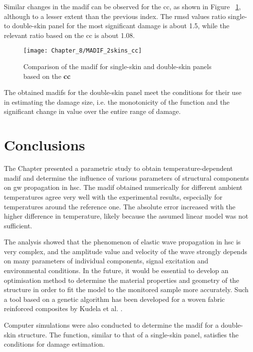 \documentclass[11pt,a4paper,final]{report}
\theoremstyle{plain}
\begin{document}
Similar changes in the \ac{madif} can be observed for the \ac{cc}, as shown in Figure ~\ref{fig:madif_2skins_cc}, although to a lesser extent than the previous index. 
The \ac{rmsd} values ratio single- to double-skin panel for the most significant damage is about 1.5, while the relevant ratio based on the \ac{cc} is about 1.08.
\begin{figure}[!htb]
	\begin{center}
		\texttt{[image: Chapter\_8/MADIF\_2skins\_cc]}
	\end{center}
	\caption{Comparison of the \acl{madif} for single-skin and double-skin panels based on the \textbf{\acf{cc}}}
	\label{fig:madif_2skins_cc}
\end{figure}

The obtained \acp{madif} for the double-skin panel meet the conditions for their use in estimating the damage size, i.e. the monotonicity of the function and the significant change in value over the entire range of damage.
 \section{Conclusions}
\label{sec:conclusionsTemp}
The Chapter presented a parametric study to obtain temperature-dependent \ac{madif} and determine the influence of various parameters of structural components on \ac{gw} propagation in \ac{hsc}. The \ac{madif} obtained numerically for different ambient temperatures agree very well with the experimental results, especially for temperatures around the reference one.
The absolute error increased with the higher difference in temperature, likely
because the assumed linear model was not sufficient.

The analysis showed that the phenomenon of elastic wave propagation in \ac{hsc} is very complex, and the amplitude value and velocity of the wave strongly depends on many parameters of individual components, signal excitation and environmental conditions.
In the future, it would be essential to develop an optimisation method to determine the material properties and geometry of the structure in order to fit the model to the monitored sample more accurately.
Such a tool based on a genetic algorithm has been developed for a woven fabric reinforced composites by Kudela et al. \cite{kudela2020elastic}.

Computer simulations were also conducted to determine the \ac{madif} for a double-skin structure.
The function, similar to that of a single-skin panel, satisfies the conditions for damage estimation.\clearpage{}
\clearpage{}
\end{document}
